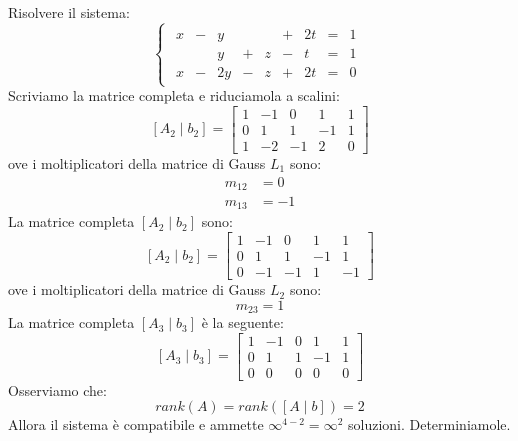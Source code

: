 \documentclass[12pt]{report}
\begin{document}
\begin{example}{}{}
Risolvere il sistema:
\[
\begin{cases}
	\begin{array}{rcrcrcrcr}
	x & - & y & & & + & 2t & = & 1 \\
	& & y & + & z & - & t & = & 1 \\
	x & -  & 2y & - & z & + & 2t & = & 0
	\end{array}
\end{cases}
\]
Scriviamo la matrice completa e riduciamola a scalini:
\[
[A_2 \mid b_2] = \left[
\begin{array}{rrrr|c}
1 & -1 & 0 & 1 & 1 \\
0 & 1 & 1 & -1 & 1 \\
1 & -2 & -1 & 2 & 0
\end{array}
\right]
\]
ove i moltiplicatori della matrice di Gauss $L_1$ sono:
\begin{align*}
	m_{12} &= 0\\
	m_{13} &= -1
\end{align*}
La matrice completa $[A_2 \mid b_2]$ sono:
\[
[A_2 \mid b_2] = \left[
\begin{array}{rrrr|c}
1 & -1 & 0 & 1 & 1 \\
0 & 1 & 1 & -1 & 1 \\
0 & -1 & -1 & 1 & -1
\end{array}
\right]
\]
ove i moltiplicatori della matrice di Gauss $L_2$ sono:
\[
m_{23} = 1
\]
La matrice completa $[A_3 \mid b_3]$ è la seguente:
\[
[A_3 \mid b_3] = \left[
\begin{array}{rrrr|c}
1 & -1 & 0 & 1 & 1 \\
0 & 1 & 1 & -1 & 1 \\
0 & 0 & 0 & 0 & 0
\end{array}
\right]
\]
Osserviamo che:
\[
rank(A) = rank([A \mid b]) = 2
\]
Allora il sistema è compatibile e ammette $\infty^{4-2} = \infty^2$ soluzioni. Determiniamole.


\end{example}
\end{document}
